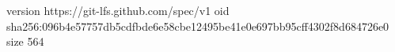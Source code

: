 version https://git-lfs.github.com/spec/v1
oid sha256:096b4e57757db5cdfbde6e58cbe12495be41e0e697bb95cff4302f8d684726e0
size 564
